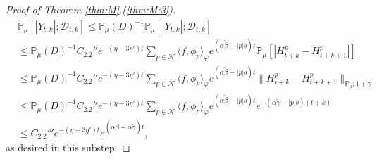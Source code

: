 \documentclass[12pt,a4paper]{amsart}
\theoremstyle{plain}
\theoremstyle{definition}
\numberwithin{equation}{section}
\begin{document}
\begin{proof}[Proof of Theorem \ref{thm:M}.(\ref{thm:M:3})]
\begin{align}
  & \widetilde{\mathbb P}_\mu[|Y_{t,k}|; \mathcal D_{t,k}]
  \leq \mathbb P_\mu(D)^{-1}\mathbb P_\mu[ |Y_{t,k}| ;\mathcal D_{t,k} ]
  \\ & \leq \mathbb P_{\mu}(D)^{-1} C_{2.2}'' e^{- (\eta - 3\eta') t}\sum_{p\in \mathcal {N}} \langle f,\phi_p\rangle_\varphi  e^{(\alpha \tilde \beta  -|p|b)t} \mathbb P_\mu[| H_{t+k}^p-H_{t+k+1}^p |]
  \\ & \leq \mathbb P_{\mu}(D)^{-1} C_{2.2}'' e^{- (\eta - 3\eta') t}\sum_{p\in \mathcal {N}} \langle f,\phi_p\rangle_\varphi  e^{(\alpha \tilde \beta  -|p|b)t} \| H_{t+k}^p-H_{t+k+1}^p \|_{\mathbb P_\mu; 1+\gamma}
  \\&\leq  \mathbb P_{\mu}(D)^{-1} C_{2.2}'' e^{- (\eta - 3\eta') t}\sum_{p\in \mathcal N} \langle f,\phi_p\rangle_\varphi  e^{(\alpha \tilde \beta  -|p|b)t} e^{-(\alpha \tilde \gamma - |p|b)(t+k)} \\
  &  \leq  C_{2.2}''' e^{- (\eta - 3\eta') t} e^{(\alpha \tilde \beta - \alpha \tilde \gamma)t}, 
\end{align} 
as desired in this substep.


\end{proof}
\end{document}

